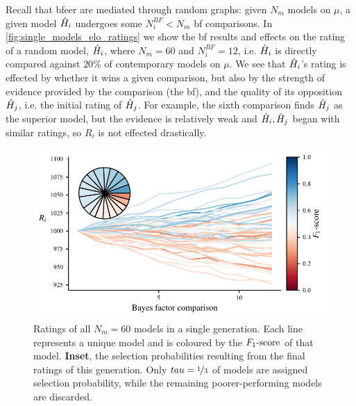 Recall that \gls{bfeer} are mediated through random graphs: 
    given $N_m$ models on $\mu$, a given model $\hat{H}_i$ undergoes some 
    $N_i^{BF} < N_m$ \gls{bf} comparisons. 
In \cref{fig:single_models_elo_ratings} we show the \gls{bf} results 
    and effects on the rating of a random model, $\hat{H}_i$, where $N_m=60$ and $N_i^{BF}=12$,
    i.e. $\hat{H}_i$ is directly compared against $20\%$ of contemporary models on $\mu$. 
We see that $\hat{H}_i$'s rating is effected by whether it wins a given comparison, 
    but also by the strength of evidence provided by the comparison (the \gls{bf}), 
    and the quality of its opposition $\hat{H}_j$, i.e. the initial rating of $\hat{H}_j$.
For example, the sixth comparison finds $\hat{H}_j$ as the superior model, 
    but the evidence is relatively weak and $\hat{H}_i, \hat{H}_j$ began with similar ratings, 
    so $R_i$ is not effected drastically. 


\par 
\begin{figure}
    \begin{center}
        \includegraphics{theoretical_study/figures/single_generation_all_ratings.pdf}
    \end{center}
    \caption[Ratings of all models in a single  generation.]{
        Ratings of all $N_m=60$ models in a single  generation.
        Each line represents a unique model and is coloured by the $ F_{1}\text{-score} $ of that model. 
        \textbf{Inset}, the selection probabilities resulting from the final ratings of this generation. 
        Only $tau=\nicefrac{1}{3}$ of models are assigned selection probability, 
            while the remaining poorer-performing models are discarded. 
        \figtableref
    }
    \label{fig:single_generation_all_ratings}
\end{figure}


